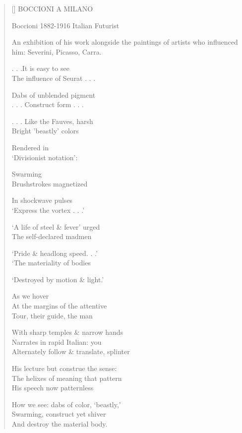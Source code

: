 \label{ch:milano_commune_di_milano}
\settowidth{\versewidth}{An exhibition of his work alongside the paintings of artists who influenced him: Severini, Picasso, Carra.}
\begin{verse}[\versewidth]
BOCCIONI A MILANO

Boccioni 1882-1916  Italian Futurist

An exhibition of his work alongside the paintings of artists who influenced him: Severini, Picasso, Carra.

. . .It is easy to see\\
The influence of Seurat . . .

Dabs of unblended pigment\\
. . . Construct form . . .

. . . Like the Fauves, harsh\\
Bright 'beastly' colors

Rendered in\\
`Divisionist notation':

Swarming\\
Brushstrokes magnetized

In shockwave pulses\\
`Express the vortex . . .'

`A life of steel \& fever' urged\\
The self-declared madmen

`Pride \& headlong speed. . .'\\
`The materiality of bodies

`Destroyed by motion \& light.'

                                As we hover\\
At the margins of the attentive\\
Tour, their guide, the man

With sharp temples \& narrow hands\\
Narrates in rapid Italian:      you\\
Alternately follow \& translate, splinter

His lecture but construe the sense:\\
The helixes of meaning that pattern\\
His speech now patternless

How we see: dabs of color,   `beastly,'\\
Swarming,     construct     yet shiver\\
And destroy the material body.
\end{verse}
